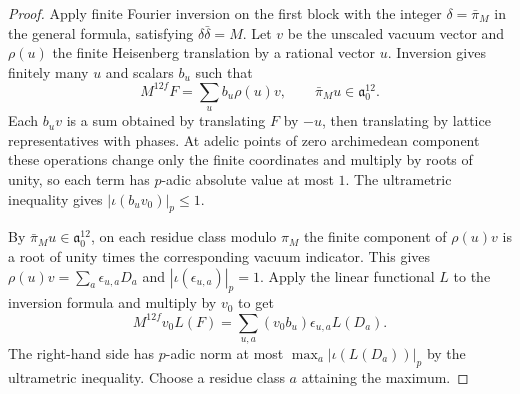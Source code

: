 \begin{proof}
Apply finite Fourier inversion on the first block with the integer $\delta=\bar\pi_M$ in the general formula, satisfying $\delta\bar\delta=M$. Let $v$ be the unscaled vacuum vector and $\rho(u)$ the finite Heisenberg translation by a rational vector $u$. Inversion gives finitely many $u$ and scalars $b_u$ such that
\[
 M^{12f}F=\sum_u b_u\rho(u)v,\qquad
 \bar\pi_M u\in\mathfrak a_0^{12}.
\]
Each $b_u v$ is a sum obtained by translating $F$ by $-u$, then translating by lattice representatives with phases. At adelic points of zero archimedean component these operations change only the finite coordinates and multiply by roots of unity, so each term has $p$-adic absolute value at most $1$. The ultrametric inequality gives $|\iota(b_u v_0)|_p\le1$.

By $\bar\pi_M u\in\mathfrak a_0^{12}$, on each residue class modulo $\pi_M$ the finite component of $\rho(u)v$ is a root of unity times the corresponding vacuum indicator. This gives $\rho(u)v=\sum_a\epsilon_{u,a}D_a$ and $|\iota(\epsilon_{u,a})|_p=1$. Apply the linear functional $L$ to the inversion formula and multiply by $v_0$ to get
\[
 M^{12f}v_0 L(F)
      =\sum_{u,a}(v_0 b_u)\epsilon_{u,a}L(D_a).
\]
The right-hand side has $p$-adic norm at most $\max_a|\iota(L(D_a))|_p$ by the ultrametric inequality. Choose a residue class $a$ attaining the maximum.
\end{proof}

